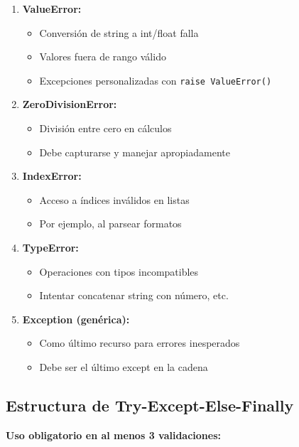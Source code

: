\documentclass[12pt,a4paper]{article}
\begin{document}
\begin{enumerate}[leftmargin=*]
    \item \textbf{ValueError:}
    \begin{itemize}
        \item Conversión de string a int/float falla
        \item Valores fuera de rango válido
        \item Excepciones personalizadas con \texttt{raise ValueError()}
    \end{itemize}
    
    \item \textbf{ZeroDivisionError:}
    \begin{itemize}
        \item División entre cero en cálculos
        \item Debe capturarse y manejar apropiadamente
    \end{itemize}
    
    \item \textbf{IndexError:}
    \begin{itemize}
        \item Acceso a índices inválidos en listas
        \item Por ejemplo, al parsear formatos
    \end{itemize}
    
    \item \textbf{TypeError:}
    \begin{itemize}
        \item Operaciones con tipos incompatibles
        \item Intentar concatenar string con número, etc.
    \end{itemize}
    
    \item \textbf{Exception (genérica):}
    \begin{itemize}
        \item Como último recurso para errores inesperados
        \item Debe ser el último except en la cadena
    \end{itemize}
\end{enumerate}

\subsection{Estructura de Try-Except-Else-Finally}

\textbf{Uso obligatorio en al menos 3 validaciones:}
\end{document}
